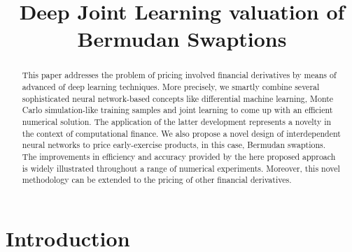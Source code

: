 
\title{Deep Joint Learning valuation of Bermudan Swaptions}
\maketitle

\begin{abstract}

This paper addresses the problem of pricing involved financial derivatives by means of advanced of deep learning techniques. More precisely, we smartly combine several sophisticated neural network-based concepts like differential machine learning, Monte Carlo simulation-like training samples and joint learning to come up with an efficient numerical solution. The application of the latter development represents a novelty in the context of computational finance. We also propose a novel design of interdependent neural networks to price early-exercise products, in this case, Bermudan swaptions. The improvements in efficiency and accuracy provided by the here proposed approach is widely illustrated throughout a range of numerical experiments. Moreover, this novel methodology can be extended to the pricing of other financial derivatives.

\end{abstract}

\section{Introduction}
    
